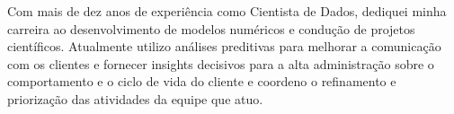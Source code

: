 \documentclass[9pt]{developercv} %
\begin{document}

\begin{minipage}[t]{1\textwidth} %
	Com mais de dez anos de experiência como Cientista de Dados, dediquei minha carreira ao desenvolvimento de modelos numéricos
	e condução de projetos científicos. Atualmente utilizo análises preditivas para melhorar a comunicação com os clientes e fornecer
	insights decisivos para a alta administração sobre o comportamento e o ciclo de vida do cliente e coordeno o refinamento e priorização
	das atividades da equipe que atuo.
\end{minipage}
\hspace{-0.3cm}
\hfill %

\begin{center}
\end{center}

\vspace{-0.2cm}
\end{document}
